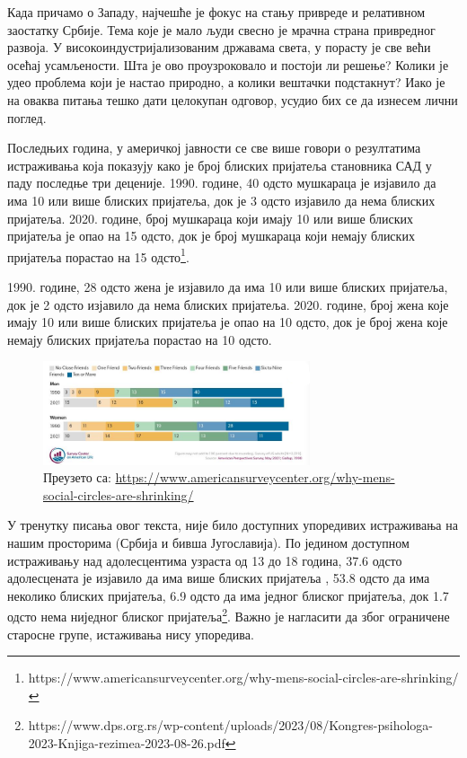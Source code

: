 \documentclass[b5paper]{article}
\newcommand{\websource}[1]{\caption*{Преузето са: \href{#1}{#1}}}
\begin{document}
\large

Када причамо о Западу, најчешће је фокус на стању привреде и релативном заостатку Србије. Тема које је мало људи свесно је мрачна страна привредног развоја. У високоиндустријализованим државама света, у порасту је све већи осећај усамљености. Шта је ово проузроковало и постоји ли решење? Колики је удео проблема који је настао природно, а колики вештачки подстакнут? Иако је на оваква питања тешко дати целокупан одговор, усудио бих се да изнесем лични поглед.

Последњих година, у америчкој јавности се све више говори о резултатима истраживања која показују како је број блиских пријатеља становника САД у паду последње три деценије. 1990. године, 40 одсто мушкараца је изјавило да има 10 или више блиских пријатеља, док је 3 одсто изјавило да нема блиских пријатеља. 2020. године, број мушкараца који имају 10 или више блиских пријатеља је опао на 15 одсто, док је број мушкараца који немају блиских пријатеља порастао на 15 одсто\footnote{https://www.americansurveycenter.org/why-mens-social-circles-are-shrinking/}.

1990. године, 28 одсто жена је изјавило да има 10 или више блиских пријатеља, док је 2 одсто изјавило да нема блиских пријатеља. 2020. године, број жена које имају 10 или више блиских пријатеља је опао на 10 одсто, док је број жена које немају блиских пријатеља порастао на 10 одсто.

\begin{figure}[H]
    \centering
    \includegraphics[width=0.7\textwidth,keepaspectratio]{slike/usa_friends.png}
    \websource{https://www.americansurveycenter.org/why-mens-social-circles-are-shrinking/}
\end{figure}

У тренутку писања овог текста, није било доступних упоредивих истраживања на нашим просторима (Србија и бивша Југославија). По једином доступном истраживању над адолесцентима узраста од 13 до 18 година, 37.6 одсто адолесцената је изјавило да има више блиских пријатеља , 53.8 одсто да има неколико блиских пријатеља, 6.9 одсто да има једног блиског пријатеља, док 1.7 одсто нема ниједног блиског пријатеља\footnote{https://www.dps.org.rs/wp-content/uploads/2023/08/Kongres-psihologa-2023-Knjiga-rezimea-2023-08-26.pdf}. Важно је нагласити да због ограничене старосне групе, истаживања нису упоредива.
\end{document}
